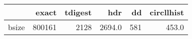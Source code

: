 \begin{tabular}{lrrrrr}
\toprule
{} &   exact &  tdigest &     hdr &   dd &  circllhist \\
\midrule
bsize &  800161 &     2128 &  2694.0 &  581 &       453.0 \\
\bottomrule
\end{tabular}
